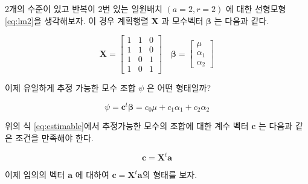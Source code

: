 \documentclass[
]{book}
\newcommand{\bm}[1]{\boldsymbol{\mathbf{#1}}}
\begin{document}
2개의 수준이 있고 반복이 2번 있는 일원배치 \((a=2,r=2)\) 에 대한 선형모형 \eqref{eq:lm2}을 생각해보자. 이 경우 계획행렬 \(\bm X\) 과 모수벡터 \(\bm \beta\) 는 다음과 같다.

\begin{equation}
\bm X = 
\begin{bmatrix}
1 & 1 & 0  \\
1 & 1 & 0  \\
1 & 0 & 1  \\
1 & 0 & 1  
\end{bmatrix}
\quad 
\bm \beta = 
\begin{bmatrix}
\mu \\
\alpha_1 \\
\alpha_2 
\end{bmatrix}
\end{equation}

이제 유일하게 추정 가능한 모수 조합 \(\psi\) 은 어떤 형태일까?

\[ \psi = \bm c^t \bm \beta = c_0 \mu + c_1 \alpha_1 + c_2 \alpha_2 \]

위의 식 \eqref{eq:estimable}에서 추정가능한 모수의 조합에 대한 계수 벡터 \(\bm c\)
는 다음과 같은 조건을 만족해야 한다.

\[ \bm c = {\bm X}^t \bm a \]

이제 임의의 벡터 \(\bm a\) 에 대하여 \(\bm c= \bm X^t \bm a\)의 형태를 보자.
\end{document}
